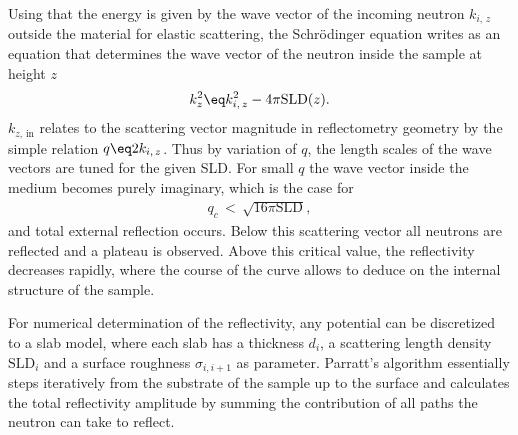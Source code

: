 \documentclass[\main/dresen_thesis.tex]{subfiles}
\begin{document}
    Using that the energy is given by the wave vector of the incoming neutron $k_{i,\,z}$ outside the material for elastic scattering, the Schr\"odinger equation writes as an equation that determines the wave vector of the neutron inside the sample at height $z$
    \begin{align}
      k_z^2 \eq   k_{i,\,z}^2 - 4 \pi  \mathrm{SLD}(z).
    \end{align}
    $k_{z,\,\mathrm{in}}$ relates to the scattering vector magnitude in reflectometry geometry by the simple relation $q \eq 2 k_{i,\,z}$.
    Thus by variation of $q$, the length scales of the wave vectors are tuned for the given SLD.
    For small $q$ the wave vector inside the medium becomes purely imaginary, which is the case for
    \begin{align}
      q_c \, < \, \sqrt{16 \pi \mathrm{SLD}},
    \end{align}
    and total external reflection occurs.
    Below this scattering vector all neutrons are reflected and a plateau is observed.
    Above this critical value, the reflectivity decreases rapidly, where the course of the curve allows to deduce on the internal structure of the sample.

    For numerical determination of the reflectivity, any potential can be discretized to a slab model, where each slab has a thickness $d_i$, a scattering length density $\mathrm{SLD}_i$ and a surface roughness $\sigma_{i,i+1}$ as parameter.
    Parratt's algorithm essentially steps iteratively from the substrate of the sample up to the surface and calculates the total reflectivity amplitude by summing the contribution of all paths the neutron can take to reflect.
\end{document}
